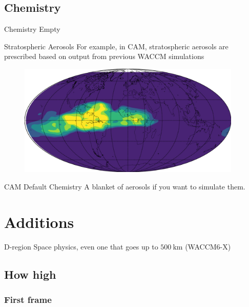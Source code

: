 \documentclass[xcolor=dvipsnames]{beamer} %
\begin{document}
\subsection{Chemistry}
\begin{frame}{Chemistry}
	Empty
\end{frame}

\begin{frame}{Stratospheric Aerosols}
	For example, in CAM, stratospheric aerosols are prescribed based on output from
	previous WACCM simulations
    \begin{figure}
        \begin{center}
            \includegraphics[width=0.95\textwidth]{./assets/frame_00009-2.png}
        \end{center}
        \label{fig:so2-distribution}
    \end{figure}
\end{frame}

\begin{frame}{CAM Default Chemistry}
	A blanket of aerosols if you want to simulate them.
\end{frame}

\section{Additions}

\begin{frame}{D-region}
	Space physics, even one that goes up to $ \SI{500}{\kilo\metre} $ (WACCM6-X)
\end{frame}

\subsection{How high}
\begin{frame}
	\frametitle{First frame}
\end{frame}
\end{document}
